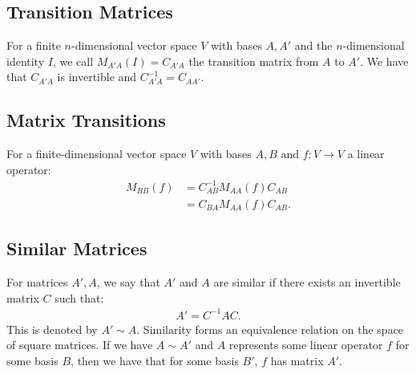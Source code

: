 \subsection{Transition Matrices}

For a finite $n$-dimensional vector space $V$ with bases $A, A'$ and 
the $n$-dimensional identity $I$, we call $M_{A'A}(I) = C_{A'A}$ the transition
matrix from $A$ to $A'$. 
We have that $C_{A'A}$ is invertible and $C_{A'A}^{-1} = C_{AA'}$.

\subsection{Matrix Transitions}

For a finite-dimensional vector space $V$ with bases 
$A, B$ and $f : V \to V$ a linear operator: \begin{align*}
  M_{BB}(f) &= C_{AB}^{-1}M_{AA}(f)C_{AB} \\
  &= C_{BA}M_{AA}(f)C_{AB}.
\end{align*}

\subsection{Similar Matrices}

For matrices $A', A$, we say that $A'$ and $A$ are similar if there
exists an invertible matrix $C$ such that: \begin{gather*}
  A' = C^{-1}AC.
\end{gather*} This is denoted by $A' \sim A$. Similarity forms
an equivalence relation on the space of square matrices.
If we have $A \sim A'$ and $A$ represents some linear operator $f$
for some basis $B$, then we have that for some basis $B'$, $f$ has
matrix $A'$.
